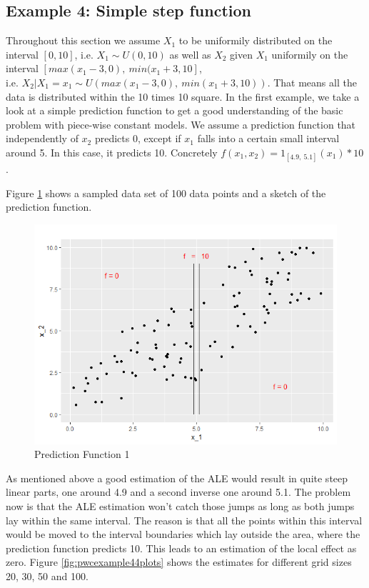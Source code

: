 \documentclass[]{krantz}
\begin{document}
\subsection{Example 4: Simple step
function}\label{example-4-simple-step-function}

Throughout this section we assume \(X_1\) to be uniformily distributed
on the interval \([0,10]\), i.e. \(X_1 \sim U(0,10)\) as well as \(X_2\)
given \(X_1\) uniformily on the interval
\([max(x_1 - 3, 0),~min( x_1 + 3, 10]\),\\
i.e.
\(X_2 \vert X_1 = x_1 \sim U(max(x_1 - 3, 0),~min( x_1 + 3, 10) )\).
That means all the data is distributed within the 10 times 10 square. In
the first example, we take a look at a simple prediction function to get
a good understanding of the basic problem with piece-wise constant
models. We assume a prediction function that independently of \(x_2\)
predicts 0, except if \(x_1\) falls into a certain small interval around
5. In this case, it predicts 10. Concretely
\(f(x_1, x_2) = 1_{[4.9,~5.1]}(x_1) * 10\).

Figure \ref{fig:pwcexample4datasetpredf} shows a sampled data set of 100
data points and a sketch of the prediction function.

\begin{figure}
\includegraphics[width=1\linewidth]{images/ALE_2_pwc_example4_dataset_predf_} \caption{Prediction Function 1}\label{fig:pwcexample4datasetpredf}
\end{figure}



As mentioned above a good estimation of the ALE would result in quite
steep linear parts, one around 4.9 and a second inverse one around 5.1.
The problem now is that the ALE estimation won't catch those jumps as
long as both jumps lay within the same interval. The reason is that all
the points within this interval would be moved to the interval
boundaries which lay outside the area, where the prediction function
predicts 10. This leads to an estimation of the local effect as zero.
Figure \ref{fig:pwcexample44plots} shows the estimates for different
grid sizes 20, 30, 50 and 100.
\end{document}
